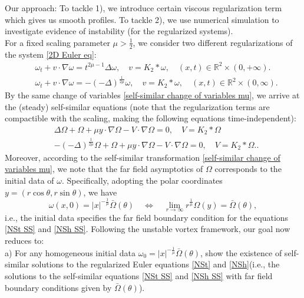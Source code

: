 \documentclass{article}
\newcommand{\reall}{\mathbb{R}}
\newcommand{\om}{\omega}
\numberwithin{equation}{section}
\begin{document}
Our approach: To tackle 1), we introduce certain viscous regularization term which gives us smooth profiles. To tackle 2), we use numerical simulation to investigate evidence of instability (for the regularized systems). \\
For a fixed scaling parameter $\mu>\frac{1}{2}$, we consider two different regularizations of the system \eqref{2D Euler eq}:
\begin{align}
    &\om_t + v\cdot\nabla\om = t^{2\mu-1}\Delta\om,\quad v= K_2*\om,\quad (x,t)\in\reall^2\times (0,+\infty). \tag{NSt}\label{NSt}\\
    &\om_t +v\cdot\nabla\om = -(-\Delta)^{\frac{1}{2\mu}}\om,\quad v= K_2*\om,\quad (x,t)\in\reall^2\times(0,\infty). \tag{NSh}\label{NSh}
\end{align}
By the same change of variables \eqref{self-similar change of variables mu}, we arrive at the (steady) self-similar equations (note that the regularization terms are compactible with the scaling, making the following equations time-independent):
\begin{align}
    &\Delta\Omega + \Omega+\mu y\cdot\nabla\Omega-V\cdot\nabla\Omega = 0, \quad V = K_2*\Omega\tag{NSt-SS}\label{NSt SS}\\
    &-(-\Delta)^{\frac{1}{2\mu}}\Omega + \Omega+\mu y\cdot\nabla\Omega-V\cdot\nabla\Omega = 0,\quad V = K_2*\Omega.\label{NSh SS}\tag{NSh-SS}.
\end{align}
Moreover, according to the self-similar transformation \eqref{self-similar change of variables mu}, we note that the far field asymptotics of $\Omega$ corresponds to the initial data of $\om$. Specifically, adopting the polar coordinates $y = (r\cos\theta, r\sin\theta)$, we have
\begin{equation}
    \om(x,0) = |x|^{-\frac{1}{\mu}}\bar\Omega(\theta)\quad \Longleftrightarrow\quad\lim_{r\to\infty}r^{\frac{1}{\mu}}\Omega(y) = \bar\Omega(\theta),
\end{equation}
i.e., the initial data specifies the far field boundary condition for the equations \eqref{NSt SS} and \eqref{NSh SS}. Following the unstable vortex framework, our goal now reduces to: \\
a) For any homogeneous initial data $\omega_0 = |x|^{-\frac{1}{\mu}}\bar\Omega(\theta)$, show the existence of self-similar solutions to the regularized Euler equations \eqref{NSt} and \eqref{NSh}(i.e., the solutions to the self-similar equations \eqref{NSt SS} and \eqref{NSh SS} with far field boundary conditions given by $\bar\Omega(\theta)$).\\
\end{document}
